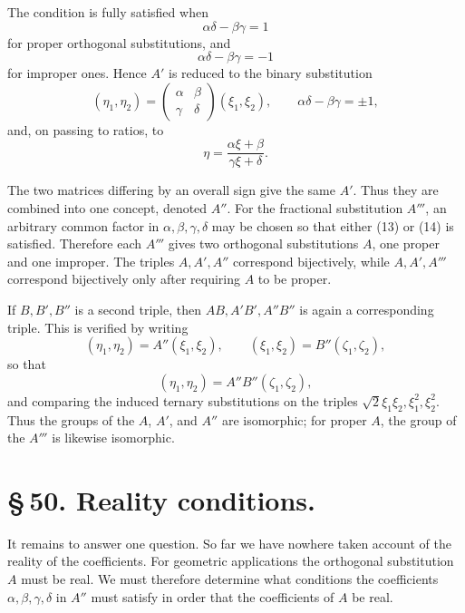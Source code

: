 \documentclass[11pt]{article}
\begin{document}
The condition is fully satisfied when
\begin{equation}
\alpha\delta-\beta\gamma=1
\tag{13}
\end{equation}
for proper orthogonal substitutions, and
\begin{equation}
\alpha\delta-\beta\gamma=-1
\tag{14}
\end{equation}
for improper ones. Hence $A'$ is reduced to the binary substitution
\begin{equation}
(\eta_1,\eta_2)=\begin{pmatrix}\alpha&\beta\\\gamma&\delta\end{pmatrix}(\xi_1,\xi_2),
\qquad \alpha\delta-\beta\gamma=\pm1,
\tag{15}
\end{equation}
and, on passing to ratios, to
\begin{equation}
\eta=\frac{\alpha\xi+\beta}{\gamma\xi+\delta}.
\tag{16}
\end{equation}

The two matrices differing by an overall sign give the same $A'$. Thus they are combined into one concept, denoted $A''$. For the fractional substitution $A'''$, an arbitrary common factor in $\alpha,\beta,\gamma,\delta$ may be chosen so that either (13) or (14) is satisfied. Therefore each $A'''$ gives two orthogonal substitutions $A$, one proper and one improper. The triples $A,A',A''$ correspond bijectively, while $A,A',A'''$ correspond bijectively only after requiring $A$ to be proper.

If $B,B',B''$ is a second triple, then $AB,A'B',A''B''$ is again a corresponding triple. This is verified by writing
\begin{equation}
(\eta_1,\eta_2)=A''(\xi_1,\xi_2),
\qquad
(\xi_1,\xi_2)=B''(\zeta_1,\zeta_2),
\tag{23}
\end{equation}
so that
\begin{equation}
(\eta_1,\eta_2)=A''B''(\zeta_1,\zeta_2),
\tag{24}
\end{equation}
and comparing the induced ternary substitutions on the triples $\sqrt2\xi_1\xi_2,\xi_1^2,\xi_2^2$. Thus the groups of the $A$, $A'$, and $A''$ are isomorphic; for proper $A$, the group of the $A'''$ is likewise isomorphic.

\section*{\S\,50. Reality conditions.}

It remains to answer one question. So far we have nowhere taken account of the reality of the coefficients. For geometric applications the orthogonal substitution $A$ must be real. We must therefore determine what conditions the coefficients $\alpha,\beta,\gamma,\delta$ in $A''$ must satisfy in order that the coefficients of $A$ be real.
\end{document}

